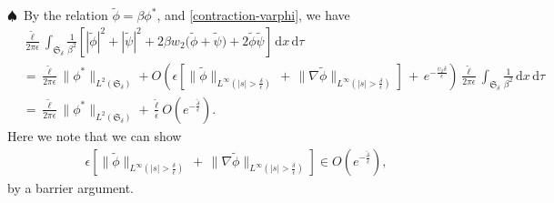 \documentclass[10pt, reqno]{amsart}
\numberwithin{equation}{section}
\theoremstyle{definition}
\def\lf{\left}
\def\ri{\right}
\begin{document}
{\smallskip
\noindent $\spadesuit$\
 By the relation $\tilde \phi = \beta \phi^* $, and \eqref{contraction-varphi},  we have
\begin{align} \label{tilde phi+tilde psi}
& \frac {\tilde \ell} {2\pi \epsilon} \int_{{\mathfrak S}_\delta} \frac {1} {\beta^2}
\left[
|{\tilde\phi}|^2+ |{\tilde\psi}|^2
+ 2\beta w_2 \big( {\tilde\phi} + {\tilde\psi} \big)
+ 2 \tilde \phi\tilde \psi
\right] \, {\mathrm d} x \,{\mathrm d}\tau
\nonumber\\[2mm]
& = \frac {\tilde \ell} {2\pi \epsilon} \|\phi^*\|_{L^2(\mathfrak S_\delta)}
+
O\left(
\epsilon \lf[\|{\tilde\phi}\|_{L^{\infty}(|s|>\frac{\delta}{\epsilon})}
\,+\, \|\nabla {\tilde\phi}\|_{L^{\infty}(|s|>\frac{\delta}{\epsilon})}\ri]
\,+\,
e^{-\frac{ \upsilon_2 \delta}{\epsilon}}
\right)
\frac {\tilde \ell} {2\pi \epsilon} \int_{{\mathfrak S}_\delta} \frac {1} {\beta^2} \, {\mathrm d} x \,{\mathrm d}\tau
\nonumber\\[2mm]
& = \frac {\tilde \ell} {2\pi \epsilon} \|\phi^*\|_{L^2(\mathfrak S_\delta)}
+
\frac{\tilde \ell} \epsilon O\left(e^{-\frac{\tilde \delta}\epsilon} \right).
\end{align}
 Here we note that we can show
\begin{align*}
\epsilon \lf[\|{\tilde\phi}\|_{L^{\infty}(|s|>\frac{\delta}{\epsilon})}
 \,+\, \|\nabla {\tilde\phi}\|_{L^{\infty}(|s|>\frac{\delta}{\epsilon})}\ri]
\in O\left(e^{-\frac{\tilde \delta}\epsilon} \right),
\end{align*}
 by a barrier argument.

}
\end{document}
